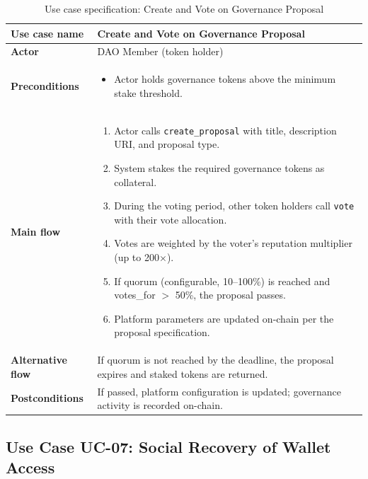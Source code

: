 \begin{table}[H]
\centering
\caption{Use case specification: Create and Vote on Governance Proposal}
\label{table:uc06}
\begin{tabular}{|l|p{10cm}|}
\hline
\textbf{Use case name} & Create and Vote on Governance Proposal \\ \hline
\textbf{Actor} & DAO Member (token holder) \\ \hline
\textbf{Preconditions} & \begin{itemize}[noitemsep]
    \item Actor holds governance tokens above the minimum stake threshold.
\end{itemize} \\ \hline
\textbf{Main flow} & \begin{enumerate}[noitemsep]
    \item Actor calls \texttt{create\_proposal} with title, description URI, and proposal type.
    \item System stakes the required governance tokens as collateral.
    \item During the voting period, other token holders call \texttt{vote} with their vote allocation.
    \item Votes are weighted by the voter's reputation multiplier (up to 200$\times$).
    \item If quorum (configurable, 10--100\%) is reached and votes\_for $>$ 50\%, the proposal passes.
    \item Platform parameters are updated on-chain per the proposal specification.
\end{enumerate} \\ \hline
\textbf{Alternative flow} & If quorum is not reached by the deadline, the proposal expires and staked tokens are returned. \\ \hline
\textbf{Postconditions} & If passed, platform configuration is updated; governance activity is recorded on-chain. \\ \hline
\end{tabular}
\end{table}

\subsection{Use Case UC-07: Social Recovery of Wallet Access}
\label{subsection:uc07}

